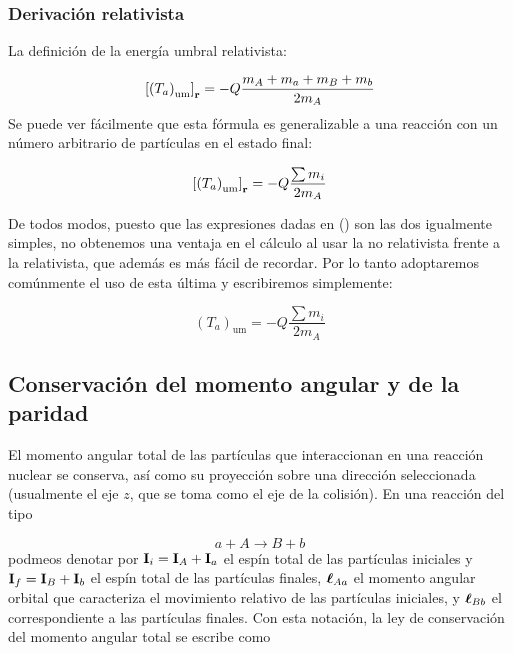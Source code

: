 \subsubsection{Derivación relativista}

La definición de la energía umbral relativista:

\begin{equation}
		\left[ \left( T_a \right)_{\text{um}} \right]_{\textbf{r}} = - Q \frac{m_A + m_a +m_B + m_b}{2m_A}
\end{equation}
Se puede ver fácilmente que esta fórmula es generalizable a una reacción con un número arbitrario de partículas en el estado final:

\begin{equation}
	\left[ \left( T_a \right)_{\text{um}} \right]_{\textbf{r}} = - Q \frac{\sum m_i}{2m_A}
\end{equation}

De todos modos, puesto que las expresiones dadas en () son las dos igualmente simples, no obtenemos una ventaja en el cálculo al usar la no relativista frente a la relativista, que además es más fácil de recordar. Por lo tanto adoptaremos comúnmente el uso de esta última y escribiremos simplemente:

\begin{mybox}
\begin{equation}
	(T_a)_{\text{um}} = -Q\frac{\sum m_i}{2m_A}
\end{equation}
\end{mybox}




\subsection{Conservación del momento angular y de la paridad}

El momento angular total de las partículas que interaccionan en una reacción nuclear se conserva, así como su proyección sobre una dirección seleccionada (usualmente el eje $z$, que se toma como el eje de la colisión). En una reacción del tipo 

\begin{equation}
    a + A \longrightarrow B + b
\end{equation}
podmeos denotar por $\mathbf{I}_i = \mathbf{I}_A + \mathbf{I}_a$ el espín total de las partículas iniciales y $\mathbf{I}_f=\mathbf{I}_B + \mathbf{I}_b$ el espín total de las partículas finales, $\boldsymbol{\ell}_{Aa}$ el momento angular orbital que caracteriza el movimiento relativo de las partículas iniciales, y $\boldsymbol{\ell}_{Bb}$ el correspondiente a las partículas finales. Con esta notación, la ley de conservación del momento angular total se escribe como 


